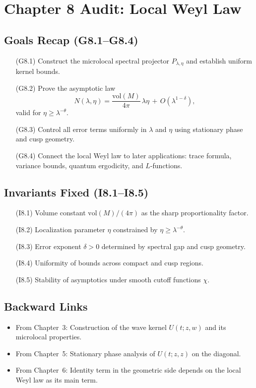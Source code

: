 
\section*{Chapter 8 Audit: Local Weyl Law}

\subsection*{Goals Recap (G8.1–G8.4)}
\begin{itemize}
  \item[(G8.1)] Construct the microlocal spectral projector $P_{\lambda,\eta}$ and establish uniform kernel bounds.
  \item[(G8.2)] Prove the asymptotic law
  \[
    N(\lambda,\eta) = \frac{\mathrm{vol}(M)}{4\pi}\,\lambda\eta \,+\, O(\lambda^{1-\delta}),
  \]
  valid for $\eta \geq \lambda^{-\theta}$.
  \item[(G8.3)] Control all error terms uniformly in $\lambda$ and $\eta$ using stationary phase and cusp geometry.
  \item[(G8.4)] Connect the local Weyl law to later applications: trace formula, variance bounds, quantum ergodicity, and $L$-functions.
\end{itemize}

\subsection*{Invariants Fixed (I8.1–I8.5)}
\begin{itemize}
  \item[(I8.1)] Volume constant $\mathrm{vol}(M)/(4\pi)$ as the sharp proportionality factor.
  \item[(I8.2)] Localization parameter $\eta$ constrained by $\eta \ge \lambda^{-\theta}$.
  \item[(I8.3)] Error exponent $\delta>0$ determined by spectral gap and cusp geometry.
  \item[(I8.4)] Uniformity of bounds across compact and cusp regions.
  \item[(I8.5)] Stability of asymptotics under smooth cutoff functions $\chi$.
\end{itemize}

\subsection*{Backward Links}
\begin{itemize}
  \item From Chapter~3: Construction of the wave kernel $U(t;z,w)$ and its microlocal properties.
  \item From Chapter~5: Stationary phase analysis of $U(t;z,z)$ on the diagonal.
  \item From Chapter~6: Identity term in the geometric side depends on the local Weyl law as its main term.
\end{itemize}

